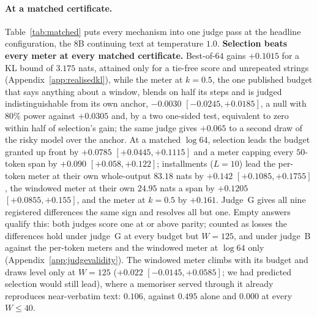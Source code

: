 \paragraph{At a matched certificate.}\label{sec:main-results}\label{sec:matched}
Table~\ref{tab:matched} puts every mechanism into one judge pass at the headline configuration, the $8$B
continuing text at temperature $1.0$. \textbf{Selection beats every meter at every matched certificate.} Best-of-$64$ gains
$+0.1015$ for a KL bound of $3.175$ nats, attained only for a tie-free score and unrepeated strings (Appendix~\ref{app:realisedkl}), while the meter at $k=0.5$, the one published budget that says anything
about a window, blends on half its steps and is judged indistinguishable from its own anchor,
$-0.0030$ $[-0.0245, +0.0185]$, a null with $80\%$ power against $+0.0305$ and, by a two one-sided test, equivalent to zero within half of selection's gain; the same judge gives $+0.065$
to a second draw of the risky model over the anchor. At a matched $\log 64$, selection leads
the budget granted up front by $+0.0785$ $[+0.0445, +0.1115]$ and a meter capping every $50$-token span by
$+0.090$ $[+0.058, +0.122]$; installments ($L=10$) lead the per-token meter at their own whole-output
$83.18$ nats by $+0.142$ $[+0.1085, +0.1755]$, the windowed meter at their own $24.95$ nats a span by
$+0.1205$ $[+0.0855, +0.155]$, and the meter at $k=0.5$ by $+0.161$. Judge~G gives all nine registered
differences the same sign and resolves all but one. Empty answers qualify this: both judges score one at or above parity; counted as losses the differences hold under judge~G at every budget but $W=125$, and under judge~B against
the per-token meters and the windowed meter at $\log 64$ only (Appendix~\ref{app:judgevalidity}). The windowed meter climbs
with its budget and draws level only at $W = 125$ ($+0.022$ $[-0.0145, +0.0585]$; we had predicted selection
would still lead), where a memoriser served through it already reproduces near-verbatim text: $0.106$,
against $0.495$ alone and $0.000$ at every $W \le 40$.

